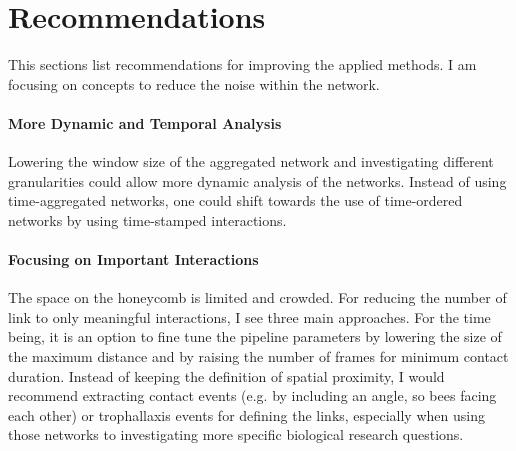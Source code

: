 \section{Recommendations}
This sections list recommendations for improving the applied methods. I am focusing on concepts to reduce the noise within the network.


\paragraph{More Dynamic and Temporal Analysis}
Lowering the window size of the aggregated network and investigating different granularities could allow more dynamic analysis of the networks.
Instead of using time-aggregated networks, one could shift towards the use of time-ordered networks by using time-stamped interactions.


\paragraph{Focusing on Important Interactions}
The space on the honeycomb is limited and crowded.
For reducing the number of link to only meaningful interactions, I see three main approaches.
For the time being, it is an option to fine tune the pipeline parameters by lowering the size of the maximum distance and by raising the number of frames for minimum contact duration.
Instead of keeping the definition of spatial proximity, I would recommend extracting contact events (e.g. by including an angle, so bees facing each other) or trophallaxis events for defining the links, especially when using those networks to investigating more specific biological research questions.


